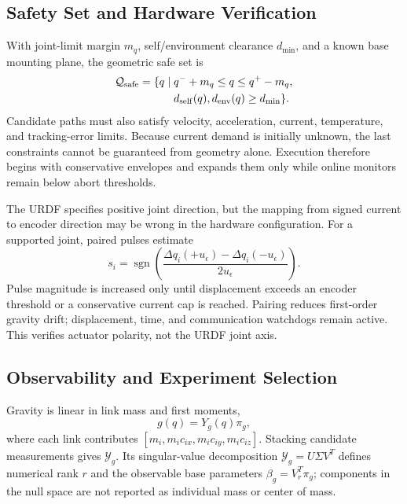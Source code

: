 \documentclass[conference]{IEEEtran}
\begin{document}
\subsection{Safety Set and Hardware Verification}
With joint-limit margin $m_q$, self/environment clearance $d_{\min}$, and a
known base mounting plane, the geometric safe set is
\begin{equation}
 \begin{aligned}
 \mathcal Q_{\rm safe}=\{q\mid{}&q^-+m_q\le q\le q^+-m_q,\\
                         &d_{\rm self}(q),d_{\rm env}(q)\ge d_{\min}\}.
 \end{aligned}
 \label{eq:safe_set}
\end{equation}
Candidate paths must also satisfy velocity, acceleration, current, temperature,
and tracking-error limits. Because current demand is initially unknown, the
last constraints cannot be guaranteed from geometry alone. Execution therefore
begins with conservative envelopes and expands them only while online monitors
remain below abort thresholds.

The URDF specifies positive joint direction, but the mapping from signed
current to encoder direction may be wrong in the hardware configuration. For a
supported joint, paired pulses estimate
\begin{equation}
 s_i=\operatorname{sgn}\!\left(
 \frac{\Delta q_i(+u_\epsilon)-\Delta q_i(-u_\epsilon)}{2u_\epsilon}\right).
 \label{eq:polarity}
\end{equation}
Pulse magnitude is increased only until displacement exceeds an encoder
threshold or a conservative current cap is reached. Pairing reduces first-order
gravity drift; displacement, time, and communication watchdogs remain active.
This verifies actuator polarity, not the URDF joint axis.

\subsection{Observability and Experiment Selection}
Gravity is linear in link mass and first moments,
\begin{equation}
 g(q)=Y_g(q)\pi_g,
 \label{eq:gravity_regressor}
\end{equation}
where each link contributes $[m_i,m_ic_{ix},m_ic_{iy},m_ic_{iz}]$. Stacking
candidate measurements gives $\mathcal Y_g$. Its singular-value decomposition
$\mathcal Y_g=U\Sigma V^T$ defines numerical rank $r$ and the observable base
parameters $\beta_g=V_r^T\pi_g$; components in the null space are not reported
as individual mass or center of mass.
\end{document}

